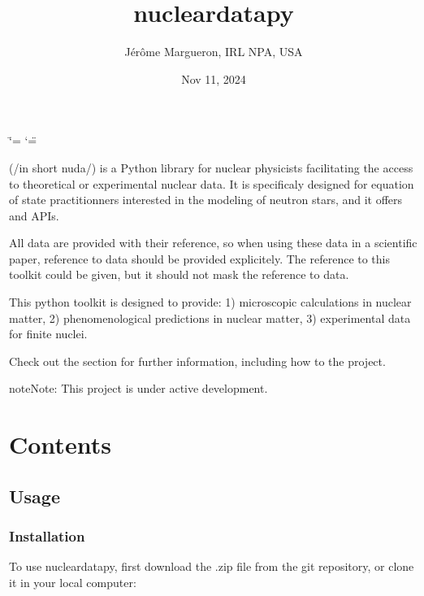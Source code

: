 \documentclass[letterpaper,10pt,english]{sphinxmanual}
\title{nucleardatapy}
\date{Nov 11, 2024}
\author{Jérôme Margueron, IRL NPA, USA}
\begin{document}
\ifdefined\shorthandoff
  \ifnum\catcode`\=\string=\active\shorthandoff{=}\fi
  \ifnum\catcode`\"=\active{}\fi
\fi

\pagestyle{empty}
\sphinxmaketitle
\pagestyle{plain}
\sphinxtableofcontents
\pagestyle{normal}
\label{\detokenize{index::doc}}


\sphinxAtStartPar
{} (/in short nuda/) is a Python library for nuclear physicists facilitating the access to theoretical or experimental nuclear data. It is specificaly designed for equation of state practitionners interested in the modeling of neutron stars, and it offers  and  APIs.

\sphinxAtStartPar
All data are provided with their reference, so when using these data in a scientific paper, reference to data should be provided explicitely. The reference to this toolkit could be given, but it should not mask the reference to data.

\sphinxAtStartPar
This python toolkit is designed to provide:
1) microscopic calculations in nuclear matter,
2) phenomenological predictions in nuclear matter,
3) experimental data for finite nuclei.

\sphinxAtStartPar
Check out the {\hyperref[\detokenize{source/usage::doc}]{}} section for further information, including how to
{\hyperref[\detokenize{source/usage:installation}]{}} the project.

\begin{sphinxadmonition}{note}{Note:}
\sphinxAtStartPar
This project is under active development.
\end{sphinxadmonition}


\chapter{Contents}
\label{\detokenize{index:contents}}
\sphinxstepscope


\section{Usage}
\label{\detokenize{source/usage:usage}}\label{\detokenize{source/usage::doc}}

\subsection{Installation}
\label{\detokenize{source/usage:installation}}\label{\detokenize{source/usage:id1}}
\sphinxAtStartPar
To use nucleardatapy, first download the .zip file from the git repository, or clone it in your local computer:
\end{document}
